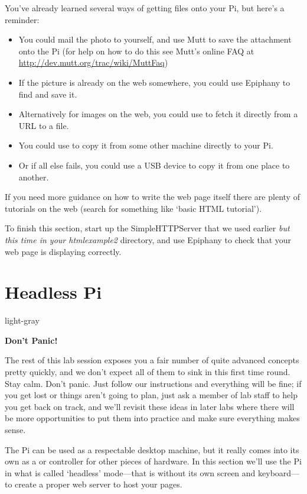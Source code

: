 You've already learned several ways of getting files onto your Pi, but here's a reminder:
\begin{itemize}
\item You could mail the photo to yourself, and use Mutt to save the attachment onto the Pi (for help on how to do this see Mutt's online FAQ at \url{http://dev.mutt.org/trac/wiki/MuttFaq})
\item If the picture is already on the web somewhere, you could use Epiphany to find and save it.
\item Alternatively for images on the web, you could use  to fetch it directly from a URL to a file.
\item You could use  to copy it from some other machine directly to your Pi.
\item Or if all else fails, you could use a USB device to copy it from one place to another.
\end{itemize}

If you need more guidance on how to write the web page itself there are plenty of tutorials on the web (search for something like `basic HTML tutorial').

To finish this section, start up the SimpleHTTPServer that we used earlier \textit{but this time in your htmlexample2} directory, and use Epiphany to check that your web page is displaying correctly.

\FloatBarrier

\section{Headless Pi}
\label{section:headless}

\begin{stdframe}{light-gray}%
  \centerline{\textbf{Don't Panic!}}
The rest of this lab session exposes you a fair number of quite advanced concepts pretty quickly, and we don't expect all of them to sink in this first time round. Stay calm.  Don't panic. Just follow our instructions and everything will be fine; if you get lost or things aren't going to plan, just ask a member of lab staff to help you get back on track, and we'll revisit these ideas in later labs where there will be more opportunities to put them into practice and make sure everything makes sense.
\end{stdframe}

The Pi can be used as a respectable desktop machine, but it really comes into its own as a  or controller for other pieces of hardware. In this section we'll use the Pi in what is called `headless' mode---that is without its own screen and keyboard---to create a proper web server to host your pages.

